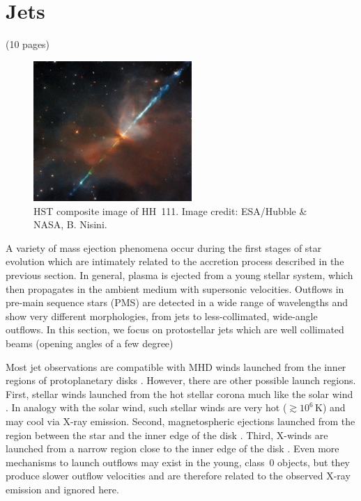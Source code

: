 
\section{Jets}
 {\color{blue}        (10 pages)}
 
 
\begin{figure}[t]
 \centering
\includegraphics[width=6cm]{figs/HH111_-_HST_-_Potw2135a.jpg}
\caption{HST composite image of HH~111. Image credit: ESA/Hubble & NASA, B. Nisini. \label{fig:HH111} }
\end{figure}
 
 
 
A variety of mass ejection phenomena occur during the first stages of star evolution which are intimately related to the accretion process described in the previous section. In general, plasma is ejected from a young stellar system, which then propagates in the ambient medium with supersonic velocities. Outflows in pre-main sequence stars (PMS) are detected in a wide range of wavelengths and show very different morphologies, from jets to less-collimated, wide-angle outflows. In this section, we focus on protostellar jets which are well collimated beams (opening angles of a few degree) 

Most jet observations are compatible with MHD winds launched from the inner regions of protoplanetary disks \citep{Frank_2014}. However, there are other possible launch regions. First, stellar winds launched from the hot stellar corona much like the solar wind \citep{Matt_2005}. In analogy with the solar wind, such stellar winds are very hot ($\gtrsim10^6$\,K) and may cool via X-ray emission. Second, magnetospheric ejections launched from the region between the star and the inner edge of the disk \citep{Zanni_2013}. Third, X-winds are launched from a narrow region close to the inner edge of the disk \citep{Shu_1994}. Even more mechanisms to launch outflows may exist  in the young, class~0 objects, but they produce slower outflow velocities and are therefore related to the observed X-ray emission and ignored here.
 
